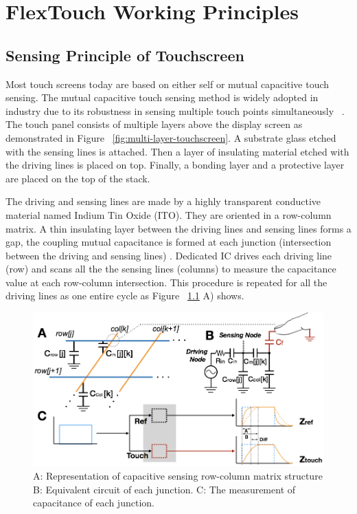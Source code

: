 \chapter{FlexTouch Working Principles}

\section{Sensing Principle of Touchscreen}
Most touch screens today are based on either self or mutual capacitive touch sensing. The mutual capacitive touch sensing method is widely adopted in industry due to its robustness in sensing multiple touch points simultaneously ~\cite{ye2015high}. The touch panel consists of multiple layers above the display screen as demonstrated in Figure ~\ref{fig:multi-layer-touchscreen}. A substrate glass etched with the sensing lines is attached. Then a layer of insulating material etched with the driving lines is placed on top. Finally, a bonding layer and a protective layer are placed on the top of the stack. 

The driving and sensing lines are made by a highly transparent conductive material named Indium Tin Oxide (ITO). They are oriented in a row-column matrix. A thin insulating layer between the driving lines and sensing lines forms a gap, the coupling mutual capacitance is formed at each junction (intersection between the driving and sensing lines) \cite{barrett2010projected}. Dedicated IC drives each driving line (row) and scans all the the sensing lines (columns) to measure the capacitance value at each row-column intersection. This procedure is repeated for all the driving lines as one entire cycle as Figure ~\ref{fig:touchscreen-principle-circuit} A) shows. 

\begin{figure}[h]
\centering
  \includegraphics[width=0.95\columnwidth]{figures/touchscreen-principle-circuit.png}
  \caption{A: Representation of capacitive sensing row-column matrix structure B: Equivalent circuit of each junction. C: The measurement of capacitance of each junction.}
  \label{fig:touchscreen-principle-circuit}
\end{figure}

